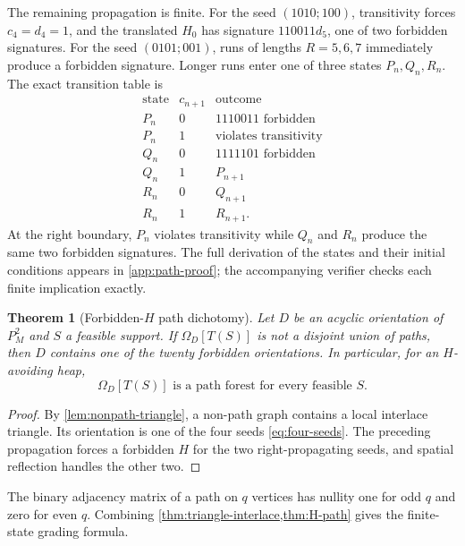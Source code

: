 \documentclass[10pt,letterpaper]{article}
\newtheorem{theorem}{Theorem}
\begin{document}
The remaining propagation is finite.  For the seed \((1010;100)\), transitivity forces \(c_4=d_4=1\), and the translated \(H_0\) has signature \(110011d_5\), one of two forbidden signatures.  For the seed \((0101;001)\), runs of lengths \(R=5,6,7\) immediately produce a forbidden signature.  Longer runs enter one of three states \(P_n,Q_n,R_n\).  The exact transition table is
\begin{equation}\label{eq:PQR-table}
\begin{array}{c|c|l}
\text{state}&c_{n+1}&\text{outcome}\\
\hline
P_n&0&1110011\text{ forbidden}\\
P_n&1&\text{violates transitivity}\\
Q_n&0&1111101\text{ forbidden}\\
Q_n&1&P_{n+1}\\
R_n&0&Q_{n+1}\\
R_n&1&R_{n+1}.
\end{array}
\end{equation}
At the right boundary, \(P_n\) violates transitivity while \(Q_n\) and \(R_n\) produce the same two forbidden signatures.  The full derivation of the states and their initial conditions appears in \cref{app:path-proof}; the accompanying verifier checks each finite implication exactly.

\begin{theorem}[Forbidden-\(H\) path dichotomy]\label{thm:H-path}
Let \(D\) be an acyclic orientation of \(P_M^2\) and \(S\) a feasible support.  If \(\Omega_D[T(S)]\) is not a disjoint union of paths, then \(D\) contains one of the twenty forbidden orientations.  In particular, for an \(H\)-avoiding heap,
\begin{equation}\label{eq:path-forest}
 \Omega_D[T(S)]\text{ is a path forest for every feasible }S.
\end{equation}
\end{theorem}

\begin{proof}
By \cref{lem:nonpath-triangle}, a non-path graph contains a local interlace triangle.  Its orientation is one of the four seeds \eqref{eq:four-seeds}.  The preceding propagation forces a forbidden \(H\) for the two right-propagating seeds, and spatial reflection handles the other two.
\end{proof}

The binary adjacency matrix of a path on \(q\) vertices has nullity one for odd \(q\) and zero for even \(q\).  Combining \cref{thm:triangle-interlace,thm:H-path} gives the finite-state grading formula.
\end{document}
